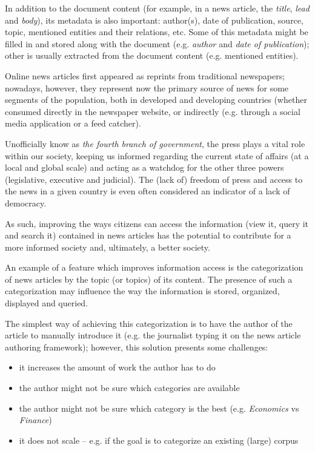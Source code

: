 \documentclass[conference]{IEEEtran}
\begin{document}
In addition to the document content (for example, in a news article,
the \emph{title}, \emph{lead} and \emph{body}), its metadata is also
important: author(s), date of publication, source, topic, mentioned
entities and their relations, etc. Some of this metadata might be
filled in and stored along with the document (e.g. \emph{author} and
\emph{date of publication}); other is usually extracted from the
document content (e.g. mentioned entities).

Online news articles first appeared as reprints from traditional
newspapers; nowadays, however, they represent now the primary source
of news for some segments of the population, both in developed and
developing countries (whether consumed directly in the newspaper
website, or indirectly (e.g. through a social media application or a
feed catcher).

Unofficially know as \emph{the fourth branch of government}, the press
plays a vital role within our society, keeping us informed regarding
the current state of affairs (at a local and global scale) and acting
as a watchdog for the other three powers (legislative, executive and
judicial). The (lack of) freedom of press and access to the news in a
given country is even often considered an indicator of a lack of
democracy\cite{goode2009social}.

As such, improving the ways citizens can access the information (view
it, query it and search it) contained in news articles has the
potential to contribute for a more informed society and, ultimately, a
better society.

An example of a feature which improves information access is the
categorization of news articles by the topic (or topics) of its
content. The presence of such a categorization may influence the way
the information is stored, organized, displayed and queried.

The simplest way of achieving this categorization is to have the
author of the article to manually introduce it (e.g. the journalist
typing it on the news article authoring framework); however, this
solution presents some challenges:
\begin{itemize}
    \item it increases the amount of work the author has to do
    \item the author might not be sure which categories are available
    \item the author might not be sure which category is the best
        (e.g. \emph{Economics} vs  \emph{Finance})
    \item it does not scale -- e.g. if the goal is to categorize an
        existing (large) corpus
\end{itemize}
\end{document}
